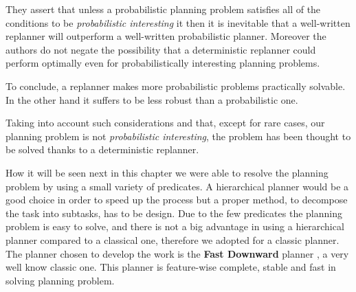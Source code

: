 They assert that unless a probabilistic planning problem satisfies all of the conditions to be \textit{probabilistic interesting} it then it is inevitable that a well-written replanner will outperform a well-written probabilistic planner. Moreover the authors do not negate the possibility that a deterministic replanner could perform optimally even for probabilistically interesting planning problems. 

To conclude, a replanner makes more probabilistic problems practically solvable. In the other hand it suffers to be less robust than a probabilistic one. 

Taking into account such considerations and that, except for rare cases, our planning problem is not \textit{probabilistic interesting}, the problem has been thought to be solved thanks to a deterministic replanner.

How it will be seen next in this chapter we were able to resolve the planning problem by using a small variety of predicates. A hierarchical planner would be a good choice in order to speed up the process but a proper method, to decompose the task into subtasks, has to be design. Due to the few predicates the planning problem is easy to solve, and there is not a big advantage in using a hierarchical planner compared to a classical one, therefore we adopted for a classic planner. 
The planner chosen to develop the work is the \textbf{Fast Downward} planner \citep{helmert2006fast}, a very well know classic one. 
This planner is feature-wise complete, stable and fast in solving planning problem.

